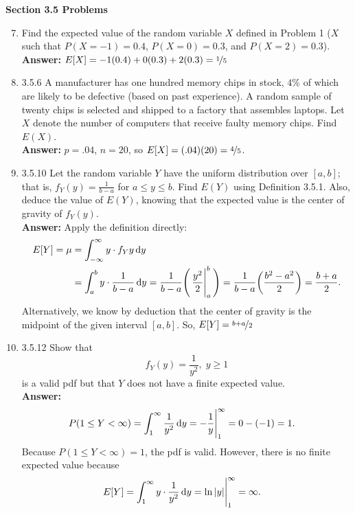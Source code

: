 \documentclass{article}
\begin{document}
    \textbf{Section 3.5 Problems}
    \begin{enumerate}\setcounter{enumi}{6}
        \item Find the expected value of the random variable $X$ defined in Problem 1 ($X$ such that $P(X=-1) = 0.4$, $P(X=0)=0.3$, and $P(X=2)=0.3$).\\
        \textbf{Answer: }$E[X] = -1(0.4)+0(0.3)+2(0.3) = \nicefrac{1}{5}$\\
                
        \item 3.5.6 A manufacturer has one hundred memory chips in stock, $4\%$ of which are likely to be defective (based on past experience). A random sample of twenty chips is selected and shipped to a factory that assembles laptops. Let $X$ denote the number of computers that receive faulty memory chips. Find $E(X)$.\\
        \textbf{Answer: }$p = .04$, $n=20$, so $E[X] = (.04)(20) = \nicefrac{4}{5}$.\\
        
        \item 3.5.10 Let the random variable $Y$ have the uniform distribution over $[a,b]$; that is, $f_Y(y) = \frac{1}{b-a}$ for $a \leq y \leq b$. Find $E(Y)$ using Definition 3.5.1. Also, deduce the value of $E(Y)$, knowing that the expected value is the center of gravity of $f_Y(y)$.\\
        \textbf{Answer: }Apply the definition directly:
            \begin{align*}
                 E[Y] = \mu &= \int_{-\infty}^\infty y \cdot f_Yy \dif y\\ 
                &= \int_a^b y \cdot \frac{1}{b-a} \dif y = \frac{1}{b-a}\Bigg(\eval{\frac{y^2}{2}}_a^b\Bigg) = \frac{1}{b-a}\bigg(\frac{b^2-a^2}{2}\bigg) = \frac{b+a}{2}.
            \end{align*}
        Alternatively, we know by deduction that the center of gravity is the midpoint of the given interval $[a,b]$. So, $E[Y] = \nicefrac{b+a}{2}$
        
        \item 3.5.12 Show that 
            \[f_Y(y) = \frac{1}{y^2}, \;  y\geq 1\]
        is a valid pdf but that $Y$ does not have a finite expected value.\\
        \textbf{Answer: }
            \begin{align*}
                P(1 \leq Y < \infty) &= \int_1^\infty \frac{1}{y^2}\dif y = \eval{-\frac{1}{y}}_1^\infty = 0 -(-1) = 1. 
            \end{align*}
        Because $P(1 \leq Y < \infty) = 1$, the pdf is valid. However, there is no finite expected value because
            \begin{align*}
                E[Y] &= \int_1^\infty y \cdot \frac{1}{y^2} \dif y = \eval{\ln{|y|}}_1^\infty = \infty.  
            \end{align*}
        

\end{enumerate}
\end{document}
